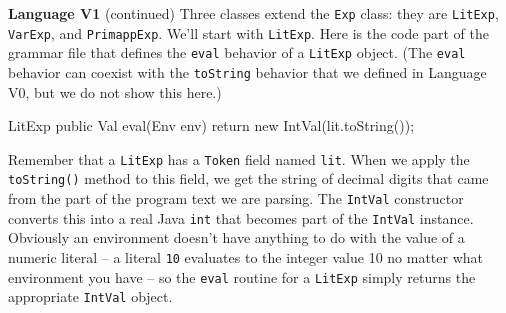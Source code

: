 \begin{minipage}[t]{\sw}
\slidenumber
\LARGE
{\bf Language V1} (continued)\exx
Three classes extend the \verb'Exp' class: they are
\verb'LitExp', \verb'VarExp', and \verb'PrimappExp'.
We'll start with \verb'LitExp'.
Here is the code part of the grammar file
that defines the \verb'eval' behavior of a \verb'LitExp' object.
(The \verb'eval' behavior can coexist with the \verb'toString' behavior
that we defined in Language V0,
but we do not show this here.)
\begin{qv}
LitExp
    public Val eval(Env env) {
        return new IntVal(lit.toString());
    }
\end{qv}
Remember that a \verb'LitExp' has a \verb'Token' field named \verb'lit'.
When we apply the \verb'toString()' method to this field,
we get the string of decimal digits
that came from the part of the program text we are parsing.
The \verb'IntVal' constructor converts this into a real Java \verb'int'
that becomes part of the \verb'IntVal' instance.
Obviously an environment doesn't have anything to do
with the value of a numeric literal --
a literal \verb'10' evaluates to the integer value 10
no matter what environment you have --
so the \verb'eval' routine for a \verb'LitExp'
simply returns the appropriate \verb'IntVal' object.
\end{minipage}
\clearpage
